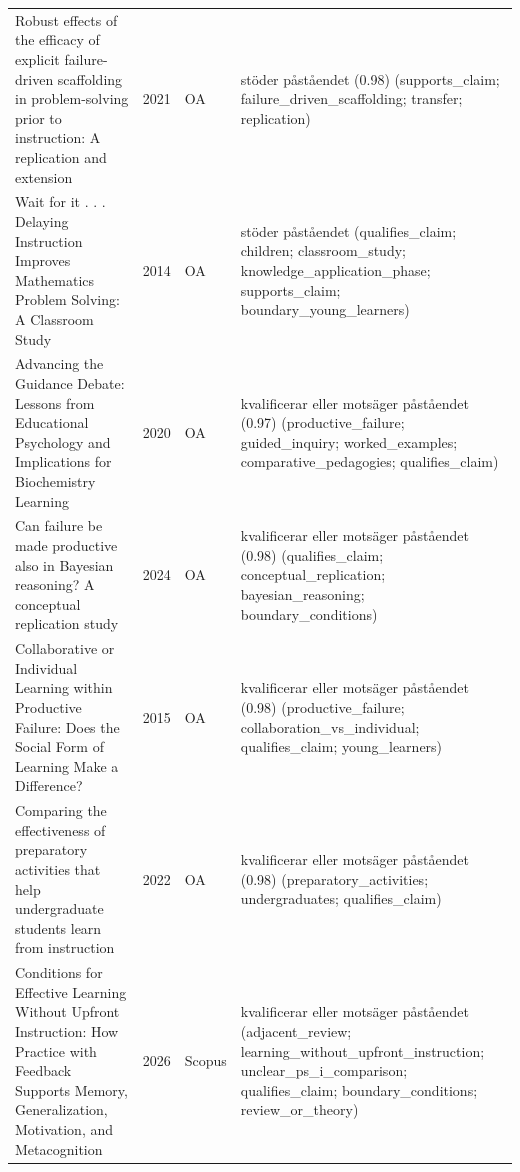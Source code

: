 \begin{longtable}{@{}%
  >{\raggedright\arraybackslash}p{}c%
  >{\raggedright\arraybackslash}p{}%
  >{\raggedright\arraybackslash\footnotesize}p{}@{}}
Robust effects of the efficacy of explicit failure-driven scaffolding in problem-solving prior to instruction: A replication and extension & 2021 & OA & stöder påståendet (0.98) (supports\_\allowbreak{}claim; failure\_\allowbreak{}driven\_\allowbreak{}scaffolding; transfer; replication) \\
Wait for it . . . Delaying Instruction Improves Mathematics Problem Solving: A Classroom Study & 2014 & OA & stöder påståendet (qualifies\_\allowbreak{}claim; children; classroom\_\allowbreak{}study; knowledge\_\allowbreak{}application\_\allowbreak{}phase; supports\_\allowbreak{}claim; boundary\_\allowbreak{}young\_\allowbreak{}learners) \\
Advancing the Guidance Debate: Lessons from Educational Psychology and Implications for Biochemistry Learning & 2020 & OA & kvalificerar eller motsäger påståendet (0.97) (productive\_\allowbreak{}failure; guided\_\allowbreak{}inquiry; worked\_\allowbreak{}examples; comparative\_\allowbreak{}pedagogies; qualifies\_\allowbreak{}claim) \\
Can failure be made productive also in Bayesian reasoning? A conceptual replication study & 2024 & OA & kvalificerar eller motsäger påståendet (0.98) (qualifies\_\allowbreak{}claim; conceptual\_\allowbreak{}replication; bayesian\_\allowbreak{}reasoning; boundary\_\allowbreak{}conditions) \\
Collaborative or Individual Learning within Productive Failure: Does the Social Form of Learning Make a Difference? & 2015 & OA & kvalificerar eller motsäger påståendet (0.98) (productive\_\allowbreak{}failure; collaboration\_\allowbreak{}vs\_\allowbreak{}individual; qualifies\_\allowbreak{}claim; young\_\allowbreak{}learners) \\
Comparing the effectiveness of preparatory activities that help undergraduate students learn from instruction & 2022 & OA & kvalificerar eller motsäger påståendet (0.98) (preparatory\_\allowbreak{}activities; undergraduates; qualifies\_\allowbreak{}claim) \\
Conditions for Effective Learning Without Upfront Instruction: How Practice with Feedback Supports Memory, Generalization, Motivation, and Metacognition & 2026 & Scopus & kvalificerar eller motsäger påståendet (adjacent\_\allowbreak{}review; learning\_\allowbreak{}without\_\allowbreak{}upfront\_\allowbreak{}instruction; unclear\_\allowbreak{}ps\_\allowbreak{}i\_\allowbreak{}comparison; qualifies\_\allowbreak{}claim; boundary\_\allowbreak{}conditions; review\_\allowbreak{}or\_\allowbreak{}theory) \\

\end{longtable}

